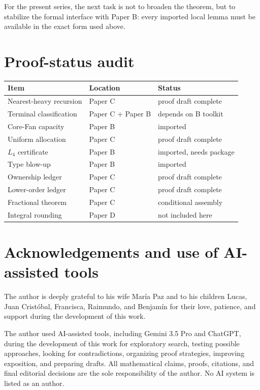 \documentclass[11pt]{article}
\theoremstyle{definition}
\begin{document}
For the present series, the next task is not to broaden the theorem, but to stabilize the formal interface with Paper B: every imported local lemma must be available in the exact form used above.

\section{Proof-status audit}

\begin{center}
\begin{tabular}{lll}
\toprule
Item & Location & Status\\
\midrule
Nearest-heavy recursion & Paper C & proof draft complete\\
Terminal classification & Paper C + Paper B & depends on B toolkit\\
Core-Fan capacity & Paper B & imported\\
Uniform allocation & Paper C & proof draft complete\\
\(L_4\) certificate & Paper B & imported, needs package\\
Type blow-up & Paper B & imported\\
Ownership ledger & Paper C & proof draft complete\\
Lower-order ledger & Paper C & proof draft complete\\
Fractional theorem & Paper C & conditional assembly\\
Integral rounding & Paper D & not included here\\
\bottomrule
\end{tabular}
\end{center}

\section*{Acknowledgements and use of AI-assisted tools}

The author is deeply grateful to his wife María Paz and to his children Lucas, Juan Cristóbal, Francisca, Raimundo, and Benjamín for their love, patience, and support during the development of this work.

The author used AI-assisted tools, including Gemini 3.5 Pro and ChatGPT, during the development of this work for exploratory search, testing possible approaches, looking for contradictions, organizing proof strategies, improving exposition, and preparing drafts. All mathematical claims, proofs, citations, and final editorial decisions are the sole responsibility of the author. No AI system is listed as an author.
\end{document}
